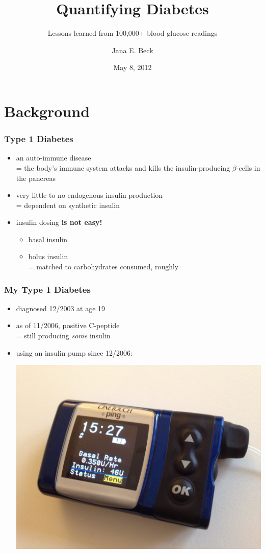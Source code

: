 \documentclass[handout]{beamer}
\author{Jana E. Beck}
\title{Quantifying Diabetes}
\subtitle{Lessons learned from 100,000+ blood glucose readings}
\date{May 8, 2012}
\begin{document}
\begin{frame}
\maketitle
\end{frame}

\section{Background}

\begin{frame}
  \frametitle{Type 1 Diabetes}

  \begin{itemize}
  \item an auto-immune disease \pause \\
    = the body's immune system attacks and kills the insulin-producing $\beta$-cells in the
    pancreas
  \pause
  \item very little to no endogenous insulin production \pause \\
    = dependent on synthetic insulin
  \pause
  \item insulin dosing \pause \textbf{is not easy!}
    \begin{itemize}
    \pause
    \item basal insulin
    \pause
    \item bolus insulin \pause \\
      = matched to carbohydrates consumed, roughly
    \end{itemize}
  \end{itemize}

\end{frame}

\begin{frame}
  \frametitle{My Type 1 Diabetes}

  \begin{itemize}
  \item diagnosed 12/2003 at age 19
  \item as of 11/2006, positive C-peptide \pause \\
    = still producing \textit{some} insulin
  \pause
  \item using an insulin pump since 12/2006:
    \begin{center}
      \includegraphics[angle=180,width=.5\linewidth]{ping.jpg}
    \end{center}
  \end{itemize}
  
\end{frame}
\end{document}
